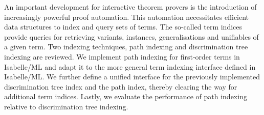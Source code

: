 \thispagestyle{empty}
\vspace*{20mm}

\begin{center}
\textbf{{\abstractname}}
\end{center}

\vspace{10mm}
An important development for interactive theorem provers is the introduction of increasingly powerful proof automation.
This automation necessitates efficient data structures to index and query sets of terms.
The so-called term indices provide queries for retrieving variants, instances, generalisations and unifiables of a given term.
Two indexing techniques, path indexing and discrimination tree indexing are reviewed.
We implement path indexing for first-order terms in Isabelle/ML and adapt it to the more general term indexing interface defined in Isabelle/ML.
We further define a unified interface for the previously implemented discrimination tree index and the path index, thereby clearing the way for additional term indices.
Lastly, we evaluate the performance of path indexing relative to discrimination tree indexing.

\cleardoublepage{}
